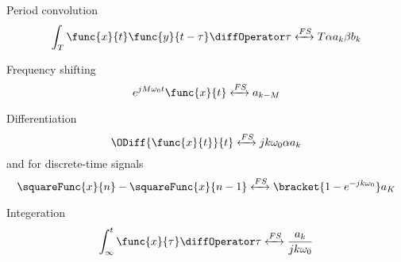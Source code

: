 \begin{definition}
\begin{equation*}
    \end{equation*}
    \item[Period convolution]
    \begin{equation*}
        \int_T \func{x}{t}\func{y}{t - \tau} \diffOperator \tau \xleftrightarrow{FS} T\alpha a_k \beta b_k
    \end{equation*}
    \item[Frequency shifting]
    \begin{equation*}
        e^{jM\omega_0 t}\func{x}{t} \xleftrightarrow{FS}  a_{k - M}
    \end{equation*}
    \item[Differentiation]
    \begin{equation*}
        \ODiff{\func{x}{t}}{t}  \xleftrightarrow{FS} jk\omega_0\alpha a_k
    \end{equation*}
    and for discrete-time signals 
    \begin{equation*}
        \squareFunc{x}{n} - \squareFunc{x}{ n - 1} \xleftrightarrow{FS} \bracket{1 - e^{-jk\omega_0}} a_K
    \end{equation*}
    \item[Integeration]          
    \begin{equation*}
        \int_{\infty}^t \func{x}{\tau} \diffOperator \tau \xleftrightarrow{FS} \dfrac{a_k}{jk \omega_0 }
    \end{equation*}
\end{definition}

